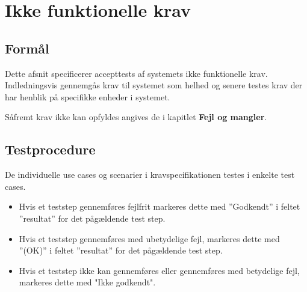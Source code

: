 \chapter{Ikke funktionelle krav}

\section*{Formål}
\vspace{-0.5cm}
Dette afsnit specificerer accepttests af systemets ikke funktionelle krav. Indledningsvis gennemgås krav til systemet som helhed og senere testes krav der har henblik på specifikke enheder i systemet. 

Såfremt krav ikke kan opfyldes angives de i kapitlet \textbf{Fejl og mangler}.

\section*{Testprocedure}
\vspace{-0.5cm}
De individuelle use cases og scenarier i kravspecifikationen testes i enkelte test cases. 

\begin{itemize}
	\item Hvis et teststep gennemføres fejlfrit markeres dette med ”Godkendt” i feltet ”resultat” for det pågældende test step.

	\item Hvis et teststep gennemføres med ubetydelige fejl, markeres dette med ”(OK)” i feltet ”resultat” for det pågældende test step.
	
	\item Hvis et teststep ikke kan gennemføres eller gennemføres med betydelige fejl, markeres dette med "Ikke godkendt".
	
\end{itemize}

\vspace{1.5cm}


